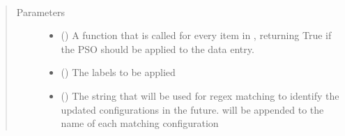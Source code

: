 \documentclass[letterpaper,10pt,english]{sphinxmanual}
\begin{document}
\begin{fulllineitems}
\begin{fulllineitems}
\begin{quote}
\begin{description}
\begin{itemize}
\end{itemize}

\end{description}\end{quote}

\end{fulllineitems}


\begin{fulllineitems}
\label{\detokenize{dataset:colabfit.tools.dataset.Dataset.attach_configuration_labels}}~\begin{quote}\begin{description}
\item[{Parameters}] \leavevmode\begin{itemize}
\item {} 
\sphinxAtStartPar
{} () \textendash{} A function that is called for every item in
, returning True if the PSO should be
applied to the data entry.

\item {} 
\sphinxAtStartPar
{} () \textendash{} The labels to be applied

\item {} 
\sphinxAtStartPar
{} () \textendash{} The string that will be used for regex matching to identify
the updated configurations in the future.  will be
appended to the name of each matching configuration

\end{itemize}

\end{description}\end{quote}

\end{fulllineitems}



\end{fulllineitems}
\end{document}
